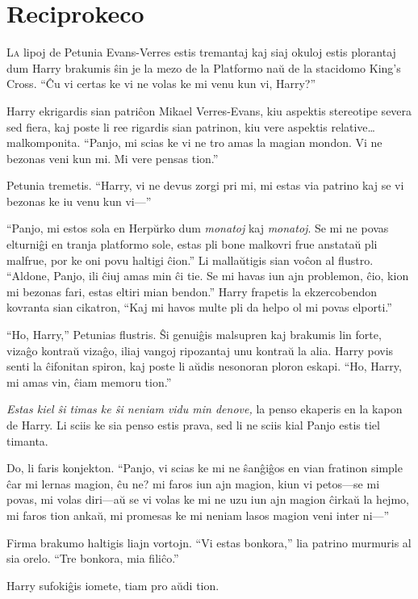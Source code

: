 \chapter{Reciprokeco}

\lettrine{L}a lipoj de Petunia Evans-Verres estis tremantaj kaj siaj okuloj estis
plorantaj dum Harry brakumis ŝin je la mezo de la Platformo naŭ de la
stacidomo King's Cross. ``Ĉu vi certas ke vi ne volas ke mi venu kun
vi, Harry?'' 

Harry ekrigardis sian patriĉon Mikael Verres-Evans, kiu aspektis
stereotipe severa sed fiera, kaj poste li ree rigardis sian patrinon,
kiu vere aspektis relative\ldots malkomponita. ``Panjo, mi scias ke vi
ne tro amas la magian mondon. Vi ne bezonas veni kun mi. Mi vere
pensas tion.''

Petunia tremetis. ``Harry, vi ne devus zorgi pri mi, mi estas via
patrino kaj se vi bezonas ke iu venu kun vi—''

``Panjo, mi estos sola en Herpŭrko dum \emph{monatoj} kaj
\emph{monatoj}. Se mi ne povas elturniĝi en tranja platformo sole,
estas pli bone malkovri frue anstataŭ pli malfrue, por ke oni povu
haltigi ĉion.'' Li mallaŭtigis sian voĉon al flustro. ``Aldone, Panjo,
ili ĉiuj amas min ĉi tie. Se mi havas iun ajn problemon, ĉio, kion mi
bezonas fari, estas eltiri mian bendon.'' Harry frapetis la ekzercobendon
kovranta sian cikatron, ``Kaj mi havos multe pli da helpo ol mi povas
elporti.''

``Ho, Harry,'' Petunias flustris. Ŝi genuiĝis malsupren kaj brakumis lin
forte, vizaĝo kontraŭ vizaĝo, iliaj vangoj ripozantaj unu kontraŭ la
alia. Harry povis senti la ĉifonitan spiron, kaj poste li aŭdis
nesonoran ploron eskapi. ``Ho, Harry, mi amas vin, ĉiam memoru tion.''

\emph{Estas kiel ŝi timas ke ŝi neniam vidu min denove,} la penso
ekaperis en la kapon de Harry. Li sciis ke sia penso estis prava, sed
li ne sciis kial Panjo estis tiel timanta.

Do, li faris konjekton. ``Panjo, vi scias ke mi ne ŝanĝiĝos en vian
fratinon simple ĉar mi lernas magion, ĉu ne? mi faros iun ajn magion,
kiun vi petos—se mi povas, mi volas diri—aŭ se vi volas ke mi ne uzu
iun ajn magion ĉirkaŭ la hejmo, mi faros tion ankaŭ, mi promesas ke mi
neniam lasos magion veni inter ni—''

Firma brakumo haltigis liajn vortojn. ``Vi estas bonkora,'' lia
patrino murmuris al sia orelo. ``Tre bonkora, mia filiĉo.''

Harry sufokiĝis iomete, tiam pro aŭdi tion.

